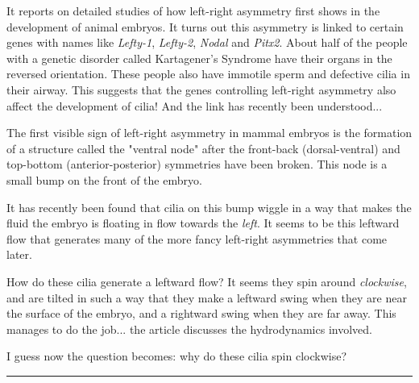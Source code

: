 It reports on detailed studies of how left-right asymmetry first shows
in the development of animal embryos.  It turns out this asymmetry is
linked to certain genes with names like \emph{Lefty-1}, \emph{Lefty-2}, 
\emph{Nodal} and \emph{Pitx2}.  
About half of the people with a genetic disorder called 
Kartagener's Syndrome have their organs in the reversed orientation.  
These people also have immotile sperm and defective cilia in their 
airway.  This suggests that the genes controlling left-right asymmetry
also affect the development of cilia!  And the link has recently been
understood...

The first visible sign of left-right asymmetry in mammal embryos 
is the formation of a structure called the "ventral node" after 
the front-back (dorsal-ventral) and top-bottom (anterior-posterior) 
symmetries have been broken.  This node is a small bump on the 
front of the embryo.  

It has recently been found that cilia on this bump wiggle in a 
way that makes the fluid the embryo is floating in flow towards 
the \emph{left}.   It seems to be this leftward flow that generates 
many of the more fancy left-right asymmetries that come later.

How do these cilia generate a leftward flow?  It seems they spin 
around \emph{clockwise}, and are tilted in such a way that they make 
a leftward swing when they are near the surface of the embryo, 
and a rightward swing when they are far away.  This manages to do
the job... the article discusses the hydrodynamics involved.  

I guess now the question becomes: why do these cilia spin clockwise?


\par\noindent\rule{\textwidth}{0.4pt}
